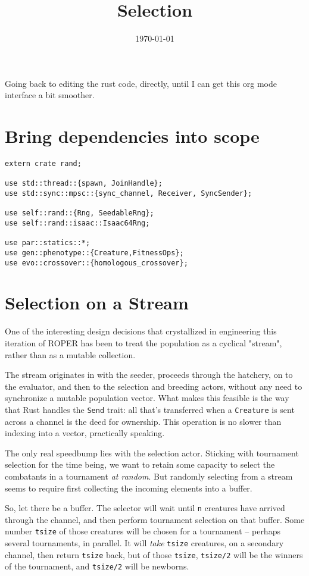 \documentclass[11pt]{article}
\date{\today}
\title{Selection}
\begin{document}
\maketitle
\tableofcontents

Going back to editing the rust code, directly, until I can get
this org mode interface a bit smoother.

\section{Bring dependencies into scope}
\label{sec:org6559107}
\lstset{language=rust,label=org4af317a,caption= ,captionpos=b,numbers=none}
\begin{lstlisting}
extern crate rand; 

use std::thread::{spawn, JoinHandle};
use std::sync::mpsc::{sync_channel, Receiver, SyncSender};

use self::rand::{Rng, SeedableRng};
use self::rand::isaac::Isaac64Rng;

use par::statics::*;
use gen::phenotype::{Creature,FitnessOps};
use evo::crossover::{homologous_crossover};
\end{lstlisting}

\section{Selection on a Stream}
\label{sec:org388b66a}

One of the interesting design decisions that crystallized in engineering
this iteration of ROPER has been to treat the population as a cyclical
"stream", rather than as a mutable collection. 

The stream originates in with the seeder, proceeds through the hatchery,
on to the evaluator, and then to the selection and breeding actors, without
any need to synchronize a mutable population vector. What makes this feasible
is the way that Rust handles the \texttt{Send} trait: all that's transferred when a
\texttt{Creature} is sent across a channel is the deed for ownership. This operation
is no slower than indexing into a vector, practically speaking. 

The only real speedbump lies with the selection actor. Sticking with tournament
selection for the time being, we want to retain some capacity to select the
combatants in a tournament \emph{at random}. But randomly selecting from a stream
seems to require first collecting the incoming elements into a buffer. 

So, let there be a buffer. The selector will wait until \texttt{n} creatures have
arrived through the channel, and then perform tournament selection on that
buffer. Some number \texttt{tsize} of those creatures will be chosen for a tournament
-- perhaps several tournaments, in parallel. It will \emph{take} \texttt{tsize} creatures, 
on a secondary channel, then return \texttt{tsize} back, but of those \texttt{tsize}, \texttt{tsize/2}
will be the winners of the tournament, and \texttt{tsize/2} will be newborns.
\end{document}
